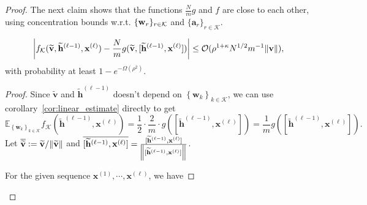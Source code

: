 \begin{proof}
	
	The next claim shows that the functions $\frac{N}{m} g$ and $f$ are close to each other, using concentration bounds w.r.t. $\{\mathbf{w}_r\}_{r \in \mathcal{K}}$ and $\{\mathbf{a}_r\}_{r \in \mathcal{K}}$.
	
	\begin{claim}\label{claim:fg}
		\begin{equation*}
			\abs{f_{\mathcal{K}}(\widetilde{\mathbf{v}}, \widetilde{\mathbf{h}}^{(\ell-1)}, \mathbf{x}^{(\ell)}) - \frac{N}{m} g(\widetilde{\mathbf{v}}, [\widetilde{\mathbf{h}}^{(\ell-1)}, \mathbf{x}^{(\ell)}])} \le \mathcal{O}( \rho^{1+\kappa} N^{1/2} m^{-1} \norm{\mathbf{v}}),  
		\end{equation*}
		with probability at least $1 - e^{-\Omega(\rho^2)}$.    
	\end{claim}
	
	\begin{proof}
		Since $\widetilde{\mathbf{v}}$ and $\widetilde{\mathbf{h}}^{(\ell-1)}$ doesn't depend on $\left\{\mathbf{w}_k\right\}_{k \in \mathcal{K}}$, we can use corollary~\ref{cor:linear_estimate} directly to get 
		\begin{equation*}
			\mathbb{E}_{\left\{\mathbf{w}_k\right\}_{k \in \mathcal{K}}} f_{\mathcal{K}}(\widetilde{\mathbf{h}}^{(\ell-1)}, \mathbf{x}^{(\ell)}) = \frac{1}{2} \cdot \frac{2}{m} \cdot g([\widetilde{\mathbf{h}}^{(\ell-1)}, \mathbf{x}^{(\ell)}]) = \frac{1}{m}g([\widetilde{\mathbf{h}}^{(\ell-1)}, \mathbf{x}^{(\ell)}]) .
		\end{equation*}
		Let $\overline{\widetilde{\mathbf{v}}} := \widetilde{\mathbf{v}}/\norm{\widetilde{\mathbf{v}}}$ and $\overline{[\widetilde{\mathbf{h}}^{(\ell-1)}, \mathbf{x}^{(\ell)}]} = \frac{[\widetilde{\mathbf{h}}^{(\ell-1)}, \mathbf{x}^{(\ell)}]}{\norm{[\widetilde{\mathbf{h}}^{(\ell-1)}, \mathbf{x}^{(\ell)}]}}$.
		
		
		
		
		For the given sequence $\mathbf{x}^{(1)}, \cdots, \mathbf{x}^{(\ell)}$, we have
		

\end{proof}
\end{proof}
